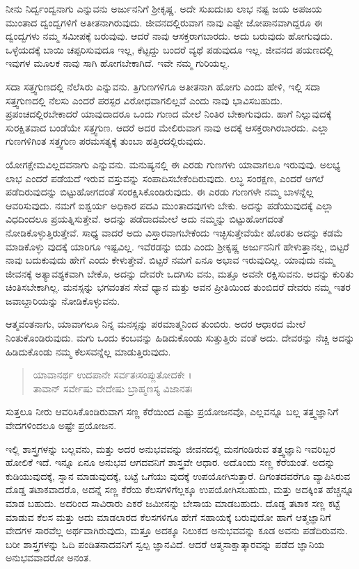 ನೀನು ನಿರ್ದ್ವಂದ್ವನಾಗು ಎನ್ನುವನು ಅರ್ಜುನನಿಗೆ ಶ್ರೀಕೃಷ್ಣ. ಅದೇ ಸುಖದುಃಖ ಲಾಭ ನಷ್ಟ ಜಯ ಅಪಜಯ ಮುಂತಾದ ದ್ವಂದ್ವಗಳಿಗೆ ಅತೀತನಾಗಿರುವುದು. ಜೀವನದಲ್ಲಿರುವಾಗ ನಾವು ಎಷ್ಟೇ ಜೋಪಾನವಾಗಿದ್ದರೂ ಈ ದ್ವಂದ್ವಗಳು ನಮ್ಮ ಸಮೀಪಕ್ಕೆ ಬರುವುವು. ಆದರೆ ನಾವು ಆಸಕ್ತರಾಗಬಾರದು. ಅದು ಬರುವುದು ಹೋಗುವುದು. ಒಳ್ಳೆಯದಕ್ಕೆ ಬಾಯಿ ಚಪ್ಪರಿಸುವುದೂ ಇಲ್ಲ, ಕೆಟ್ಟದ್ದು ಬಂದರೆ ವ್ಯಥೆ ಪಡುವುದೂ ಇಲ್ಲ. ಜೀವನದ ಪಯಣದಲ್ಲಿ ಇವುಗಳ ಮೂಲಕ ನಾವು ಸಾಗಿ ಹೋಗಬೇಕಾಗಿದೆ. ಇವೇ ನಮ್ಮ ಗುರಿಯಲ್ಲ.

ಸದಾ ಸತ್ತ್ವಗುಣದಲ್ಲಿ ನೆಲೆಸಿರು ಎನ್ನುವನು. ತ್ರಿಗುಣಗಳಿಗೂ ಅತೀತನಾಗಿ ಹೋಗು ಎಂದು ಹೇಳಿ, ಇಲ್ಲಿ ಸದಾ ಸತ್ತ್ವಗುಣದಲ್ಲಿ ನೆಲಸು ಎಂದರೆ ಪರಸ್ಪರ ವಿರೋಧವಾಗಲಿಲ್ಲವೆ ಎಂದು ನಾವು ಭಾವಿಸಬಹುದು. ಪ್ರಪಂಚದಲ್ಲಿರಬೇಕಾದರೆ ಯಾವುದಾದರೂ ಒಂದು ಗುಣದ ಮೇಲೆ ನಿಂತಿರ ಬೇಕಾಗುವುದು. ಹಾಗೆ ನಿಲ್ಲುವುದಕ್ಕೆ ಸುರಕ್ಷಿತವಾದ ಬಂಡೆಯೇ ಸತ್ತ್ವಗುಣ. ಆದರೆ ಅದರ ಮೇಲಿರುವಾಗ ನಾವು ಅದಕ್ಕೆ ಆಸಕ್ತರಾಗಿರಬಾರದು. ಎಲ್ಲಾ ಗುಣಗಳಿಗಿಂತ ಸತ್ತ್ವಗುಣ ಪರಮಸತ್ಯಕ್ಕೆ ತುಂಬಾ ಹತ್ತಿರದಲ್ಲಿರುವುದು.

ಯೋಗಕ್ಷೇಮವಿಲ್ಲದವನಾಗು ಎನ್ನುವನು. ಮನುಷ್ಯನಲ್ಲಿ ಈ ಎರಡು ಗುಣಗಳು ಯಾವಾಗಲೂ ಇರುವುವು. ಅಲಭ್ಯ ಲಾಭ ಎಂದರೆ ಪಡೆಯದೆ ಇರುವ ವಸ್ತುವನ್ನು ಸಂಪಾದಿಸಬೇಕೆಂದಿರುವುದು. ಲಬ್ಧ ಸಂರಕ್ಷಣ, ಎಂದರೆ ಆಗಲೆ ಪಡೆದಿರುವುದನ್ನು ಬಿಟ್ಟುಹೋಗದಂತೆ ಸಂರಕ್ಷಿಸಿಕೊಂಡಿರುವುದು. ಈ ಎರಡು ಗುಣಗಳೇ ನಮ್ಮ ಬಾಳನ್ನೆಲ್ಲ ಆವರಿಸುವುದು. ನಮಗೆ ಐಶ್ವರ್ಯ ಅಧಿಕಾರ ಪದವಿ ಮುಂತಾದವುಗಳು ಬೇಕು. ಅದನ್ನು ಪಡೆಯುವುದಕ್ಕೆ ಎಲ್ಲಾ ವಿಧದಿಂದಲೂ ಪ್ರಯತ್ನಿಸುತ್ತೇವೆ. ಅದನ್ನು ಪಡೆದಾದಮೇಲೆ ಅದು ನಮ್ಮನ್ನು ಬಿಟ್ಟುಹೋಗದಂತೆ ನೋಡಿಕೊಳ್ಳುತ್ತಿರುತ್ತೇವೆ. ಸಾಧ್ಯ ವಾದರೆ ಅದು ವಿಸ್ತಾರವಾಗಬೇಕೆಂದು ಇಚ್ಛಿಸುತ್ತೇವೆಯೇ ಹೊರತು ಅದನ್ನು ಕಡಮೆ ಮಾಡಿಕೊಳ್ಳು ವುದಕ್ಕೆ ಯಾರಿಗೂ ಇಷ್ಟವಿಲ್ಲ. ಇವೆರಡನ್ನು ಬಿಡು ಎಂದು ಶ್ರೀಕೃಷ್ಣ ಅರ್ಜುನನಿಗೆ ಹೇಳುತ್ತಾನಲ್ಲ, ಬಿಟ್ಟರೆ ನಾವು ಬದುಕುವುದು ಹೇಗೆ ಎಂದು ಕೇಳುತ್ತೇವೆ. ಬಿಟ್ಟರೆ ನಮಗೆ ಏನೂ ಅಭಾವ ಇರುವುದಿಲ್ಲ. ಯಾವುದು ನಮ್ಮ ಜೀವನಕ್ಕೆ ಅತ್ಯಾವಶ್ಯಕವಾಗಿ ಬೇಕೊ, ಅದನ್ನು ದೇವರೇ ಒದಗಿಸು ವನು, ಮತ್ತೂ ಅವನೇ ರಕ್ಷಿಸುವನು. ಅದನ್ನು ಕುರಿತು ಚಿಂತಿಸಬೇಕಾಗಿಲ್ಲ. ಮನಸ್ಸನ್ನು ಭಗವಂತನ ಸೇವೆ ಧ್ಯಾನ ಮತ್ತು ಅವನ ಪ್ರೀತಿಯಿಂದ ತುಂಬಿದರೆ ದೇವರು ನಮ್ಮ ಇತರ ಜವಾಬ್ದಾರಿಯನ್ನು ನೋಡಿಕೊಳ್ಳುವನು.

ಆತ್ಮವಂತನಾಗು, ಯಾವಾಗಲೂ ನಿನ್ನ ಮನಸ್ಸನ್ನು ಪರಮಾತ್ಮನಿಂದ ತುಂಬಿರು. ಅದರ ಆಧಾರದ ಮೇಲೆ ನಿಂತುಕೊಂಡಿರುವುದು. ಮಗು ಒಂದು ಕಂಬವನ್ನು ಹಿಡಿದುಕೊಂಡು ಸುತ್ತುತ್ತಿರು ವಂತೆ ಅದು. ದೇವರನ್ನು ನೆಚ್ಚಿ ಅದನ್ನು ಹಿಡಿದುಕೊಂಡು ನಮ್ಮ ಕೆಲಸವನ್ನೆಲ್ಲ ಮಾಡುತ್ತಿರುವುದು.

\begin{verse}
ಯಾವಾನರ್ಥ ಉದಪಾನೇ ಸರ್ವತಃಸಂಪ್ಲುತೋದಕೇ ।\\ತಾವಾನ್ ಸರ್ವೇಷು ವೇದೇಷು ಬ್ರಾಹ್ಮಣಸ್ಯ ವಿಜಾನತಃ 
\end{verse}

{\small ಸುತ್ತಲೂ ನೀರು ಆವರಿಸಿಕೊಂಡಿರುವಾಗ ಸಣ್ಣ ಕೆರೆಯಿಂದ ಎಷ್ಟು ಪ್ರಯೋಜನವೊ, ಎಲ್ಲವನ್ನೂ ಬಲ್ಲ ತತ್ತ್ವಜ್ಞಾನಿಗೆ ವೇದಗಳಿಂದಲೂ ಅಷ್ಟೇ ಪ್ರಯೋಜನ.}

ಇಲ್ಲಿ ಶಾಸ್ತ್ರಗಳನ್ನು ಬಲ್ಲವನು, ಮತ್ತು ಅದರ ಅನುಭವವನ್ನು ಜೀವನದಲ್ಲಿ ಮನಗಂಡಿರುವ ತತ್ತ್ವಜ್ಞಾನಿ ಇವರಿಬ್ಬರ ಹೋಲಿಕೆ ಇದೆ. ಇನ್ನೂ ಏನೂ ಅನುಭವ ಆಗದವನಿಗೆ ಶಾಸ್ತ್ರವೇ ಆಧಾರ. ಅದೊಂದು ಸಣ್ಣ ಕೆರೆಯಂತೆ. ಅದನ್ನು ಕುಡಿಯುವುದಕ್ಕೆ, ಸ್ನಾನ ಮಾಡುವುದಕ್ಕೆ, ಬಟ್ಟೆ ಒಗೆಯು ವುದಕ್ಕೆ ಉಪಯೋಗಿಸುತ್ತಾರೆ. ದಿಗಂತದವರೆಗೂ ವ್ಯಾಪಿಸಿರುವ ದೊಡ್ಡ ತಟಾಕವಾದರೊ, ಅದನ್ನೆ ಸಣ್ಣ ಕೆರೆಯ ಕೆಲಸಗಳಿಗೆಲ್ಲಕ್ಕೂ ಉಪಯೋಗಿಸಬಹುದು, ಮತ್ತು ಅದಕ್ಕಿಂತ ಹೆಚ್ಚನ್ನೂ ಮಾಡ ಬಹುದು. ಅದರಿಂದ ಸಾವಿರಾರು ಎಕರೆ ಜಮೀನನ್ನು ಬೇಸಾಯ ಮಾಡಬಹುದು. ದೊಡ್ಡ ತಟಾಕ ಸಣ್ಣ ಕಟ್ಟೆ ಮಾಡುವ ಕೆಲಸ ಮತ್ತು ಅದು ಮಾಡಲಾರದ ಕೆಲಸಗಳಿಗೂ ಹೇಗೆ ಸಹಾಯಕ್ಕೆ ಬರುವುದೋ ಹಾಗೆ ಆತ್ಮಜ್ಞಾನಿಗೆ ವೇದಗಳ ಸಾರವೆಲ್ಲ ಅರ್ಥವಾಗಿರುವುದು, ಮತ್ತೂ ಅದಕ್ಕೂ ನಿಲುಕದ ಅನುಭವವನ್ನು ಕೂಡ ಅವನು ಪಡೆದಿರುವನು. ಬರೀ ಶಾಸ್ತ್ರಗಳನ್ನು ಓದಿ ಪಂಡಿತನಾದವನಿಗೆ ಸ್ವಲ್ಪ ಜ್ಞಾನವಿದೆ. ಆದರೆ ಆತ್ಮಸಾಕ್ಷಾತ್ಕಾರವನ್ನು ಪಡೆದ ಜ್ಞಾನಿಯ ಅನುಭವವಾದರೋ ಅನಂತ.

